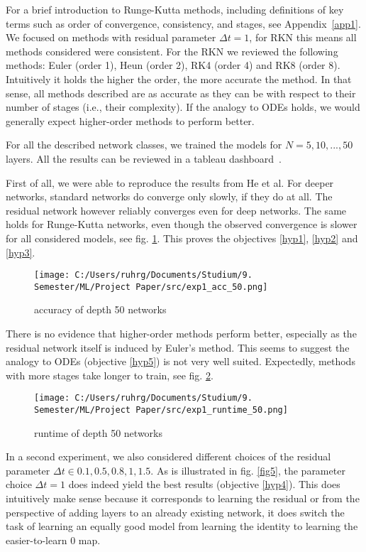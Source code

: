 \documentclass{article}
\begin{document}
For a brief introduction to Runge-Kutta methods, including definitions of key terms such as order of convergence, consistency, and stages, see Appendix~\ref{app1}. We focused on methods with residual parameter $\Delta t = 1$, for RKN this means all methods considered were consistent. For the RKN we reviewed the following methods: Euler (order 1), Heun (order 2), RK4 (order 4) and RK8 (order 8). Intuitively it holds the higher the order, the more accurate the method. In that sense, all methods described are as accurate as they can be with respect to their number of stages (i.e., their complexity). If the analogy to ODEs holds, we would generally expect higher-order methods to perform better.

For all the described network classes, we trained the models for $N = 5, 10, ..., 50$ layers. All the results can be reviewed in a tableau dashboard~\citep{tom2024tableau}.

First of all, we were able to reproduce the results from He et al. For deeper networks, standard networks do converge only slowly, if they do at all. The residual network however reliably converges even for deep networks. The same holds for Runge-Kutta networks, even though the observed convergence is slower for all considered models, see fig. \ref{fig3}. This proves the objectives \ref{hyp1}, \ref{hyp2} and \ref{hyp3}.

\begin{figure}[h!]
    \centering
    \texttt{[image: C:/Users/ruhrg/Documents/Studium/9. Semester/ML/Project Paper/src/exp1\_acc\_50.png]}
    \caption{accuracy of depth 50 networks}
    \label{fig3}
\end{figure}

There is no evidence that higher-order methods perform better, especially as the residual network itself is induced by Euler's method. This seems to suggest the analogy to ODEs (objective \ref{hyp5}) is not very well suited. Expectedly, methods with more stages take longer to train, see fig. \ref{fig4}.

\begin{figure}[h!]
    \centering
    \texttt{[image: C:/Users/ruhrg/Documents/Studium/9. Semester/ML/Project Paper/src/exp1\_runtime\_50.png]}
    \caption{runtime of depth 50 networks}
    \label{fig4}
\end{figure}

In a second experiment, we also considered different choices of the residual parameter $\Delta t \in {0.1, 0.5, 0.8, 1, 1.5}$. As is illustrated in fig. \ref{fig5}, the parameter choice $\Delta t = 1$ does indeed yield the best results (objective \ref{hyp4}). This does intuitively make sense because it corresponds to learning the residual or from the perspective of adding layers to an already existing network, it does switch the task of learning an equally good model from learning the identity to learning the easier-to-learn 0 map.
\end{document}
